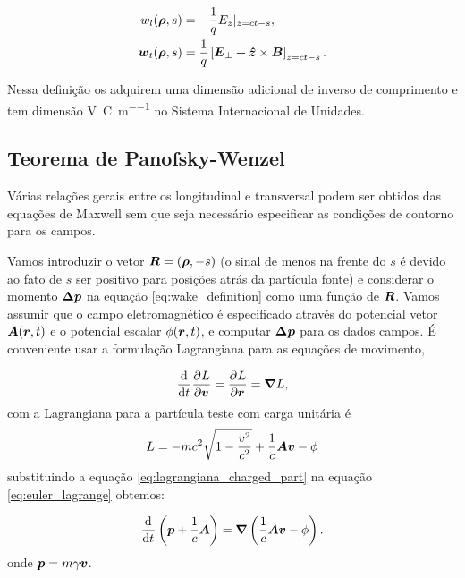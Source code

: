 \begin{equation}\begin{aligned}
    w_l(\boldsymbol{\rho},s) &= -\frac1q E_z|_{z=ct-s}, \\
    \boldsymbol{w}_t(\boldsymbol{\rho},s) &= \frac1q\left[\boldsymbol{E}_\perp + \boldsymbol{\hat{z}}\times \boldsymbol{B}\right]_{z=ct-s}.
\end{aligned}\end{equation}

Nessa definição os  adquirem uma dimensão adicional de inverso de comprimento e tem dimensão \si{\volt\per\coulomb\per\meter} no Sistema Internacional de Unidades.

\subsection{Teorema de Panofsky-Wenzel}

Várias relações gerais entre os  longitudinal e transversal podem ser obtidos das equações de Maxwell sem que seja necessário especificar as condições de contorno para os campos.

Vamos introduzir o vetor $\boldsymbol{R} =(\boldsymbol{\rho},-s)$ (o sinal de menos na frente do $s$ é devido ao fato de $s$ ser positivo para posições atrás da partícula fonte) e considerar o momento $\boldsymbol{\Delta p}$ na equação \ref{eq:wake_definition} como uma função de $\boldsymbol{R}$. Vamos assumir que o campo eletromagnético é especificado através do potencial vetor $\boldsymbol{A}(\boldsymbol{r},t)$ e o potencial escalar $\phi(\boldsymbol{r},t)$, e computar
$\boldsymbol{\Delta p}$ para os dados campos. É conveniente usar a formulação Lagrangiana para as equações de movimento,

\begin{equation}\label{eq:euler_lagrange}
    \frac{\mathrm{d}^{{}}}{\mathrm{d} t^{{}}}\frac{\partial^{{}}L}{\partial \boldsymbol{v}^{{}}} = \frac{\partial^{{}}L}{\partial \boldsymbol{r}^{{}}} = \boldsymbol{\nabla}L,
\end{equation}
com a Lagrangiana para a partícula teste com carga unitária é
\begin{equation}\label{eq:lagrangiana_charged_part}
   L = -mc^2 \sqrt{1 - \frac{v^2}{c^2}} + \frac1c \boldsymbol{Av} - \phi
\end{equation}
substituindo a equação \ref{eq:lagrangiana_charged_part} na equação \ref{eq:euler_lagrange} obtemos:

\begin{equation}
 \frac{\mathrm{d}^{{}}}{\mathrm{d} t^{{}}} \left(\boldsymbol{p} + \frac1c \boldsymbol{A}\right) = \boldsymbol{\nabla}\left(\frac1c \boldsymbol{Av} - \phi\right).
\end{equation}
onde $\boldsymbol{p} = m\gamma\boldsymbol{v}$.

